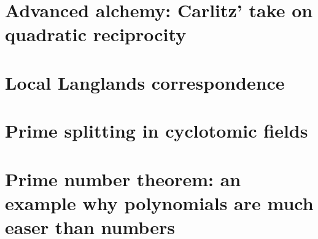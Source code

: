 \documentclass[a4paper]{memoir}
\begin{document}
\section{Advanced alchemy: Carlitz' take on quadratic reciprocity}

\section{Local Langlands correspondence}

\section{Prime splitting in cyclotomic fields}

\section{Prime number theorem: an example why polynomials are much easer than numbers}



\end{document}

